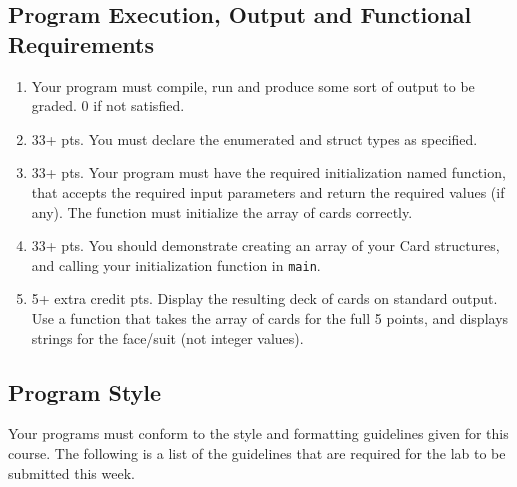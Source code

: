 \documentclass[11pt]{article}
\begin{document}
\subsection*{Program Execution, Output and Functional Requirements}
\label{sec-5-1}


\begin{enumerate}
\item Your program must compile, run and produce some sort of output to be
  graded. 0 if not satisfied.
\item 33+ pts.  You must declare the enumerated and struct types as
   specified.
\item 33+ pts.  Your program must have the required initialization named
   function, that accepts the required input parameters and return the
   required values (if any).  The function must initialize the
   array of cards correctly.
\item 33+ pts. You should demonstrate creating an array of your Card
   structures, and calling your initialization function in \verb~main~.
\item 5+ extra credit pts.  Display the resulting deck of cards on
   standard output.  Use a function that takes the array of cards
   for the full 5 points, and displays strings for the face/suit
   (not integer values).
\end{enumerate}
\subsection*{Program Style}
\label{sec-5-2}


Your programs must conform to the style and formatting guidelines given for this course.
The following is a list of the guidelines that are required for the lab to be submitted
this week.
\end{document}

